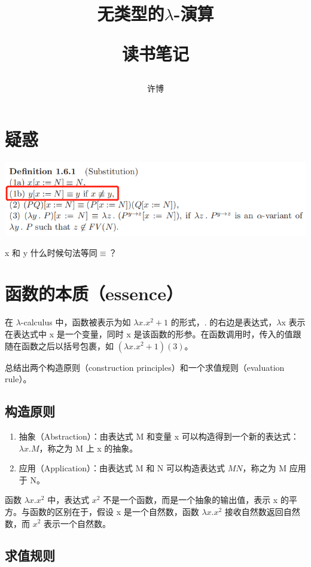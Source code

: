 \documentclass[UTF8]{article}
\title{无类型的$\lambda$-演算\\[2ex]\begin{large}读书笔记\end{large}}
\author{许博}
\date{}
\begin{document}
\maketitle
	
\section{疑惑}
	\includegraphics[width=0.93\linewidth]{"../imgs/1-1.png"}
	
	x 和 y 什么时候句法等同$\equiv$？
	
\section{函数的本质（essence）}

	在 $\lambda$-calculus 中，函数被表示为如 $\lambda x. x^2 + 1$ 的形式，. 的右边是表达式，$\lambda$x 表示在表达式中 x 是一个变量，同时 x 是该函数的形参。在函数调用时，传入的值跟随在函数之后以括号包裹，如 $(\lambda x. x^2 + 1)(3)$。
	
	总结出两个构造原则（construction principles）和一个求值规则（evaluation rule）。
	
\subsection{构造原则}

	\begin{enumerate}
		\item 抽象（Abstraction）：由表达式 M 和变量 x 可以构造得到一个新的表达式：$\lambda x. M$，称之为 M 上 x 的抽象。
		\item 应用（Application）：由表达式 M 和 N 可以构造表达式 $M N$，称之为 M 应用于 N。
	\end{enumerate}

	函数 $\lambda x. x^2$ 中，表达式 $x^2$ 不是一个函数，而是一个抽象的输出值，表示 x 的平方。与函数的区别在于，假设 x 是一个自然数，函数 $\lambda x. x^2$ 接收自然数返回自然数，而 $x^2$ 表示一个自然数。
	
\subsection{求值规则}
	
\end{document}
